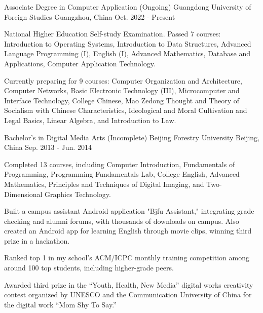 

\begin{cventries}

  \cventry
    {Associate Degree in Computer Application (Ongoing)} %
    {Guangdong University of Foreign Studies} %
    {Guangzhou, China} %
    {Oct. 2022 - Present} %
    {
      \begin{cvitems} %
        \item {National Higher Education Self-study Examination. Passed 7 courses: Introduction to Operating Systems, Introduction to Data Structures, Advanced Language Programming (I), English (I), Advanced Mathematics, Database and Applications, Computer Application Technology.}
        \item {Currently preparing for 9 courses: Computer Organization and Architecture, Computer Networks, Basic Electronic Technology (III), Microcomputer and Interface Technology, College Chinese, Mao Zedong Thought and Theory of Socialism with Chinese Characteristics, Ideological and Moral Cultivation and Legal Basics, Linear Algebra, and Introduction to Law.}
      \end{cvitems}
    }

  \cventry
    {Bachelor’s in Digital Media Arts (Incomplete)} %
    {Beijing Forestry University} %
    {Beijing, China} %
    {Sep. 2013 - Jun. 2014} %
    {
      \begin{cvitems} %
        \item {Completed 13 courses, including Computer Introduction, Fundamentals of Programming, Programming Fundamentals Lab, College English, Advanced Mathematics, Principles and Techniques of Digital Imaging, and Two-Dimensional Graphics Technology.}
        \item {Built a campus assistant Android application "Bjfu Assistant," integrating grade checking and alumni forums, with thousands of downloads on campus. Also created an Android app for learning English through movie clips, winning third prize in a hackathon.}
        \item {Ranked top 1 in my school's ACM/ICPC monthly training competition among around 100 top students, including higher-grade peers.}
        \item {Awarded third prize in the “Youth, Health, New Media” digital works creativity contest organized by UNESCO and the Communication University of China for the digital work “Mom Shy To Say.”}
      \end{cvitems}
    }


\end{cventries}
